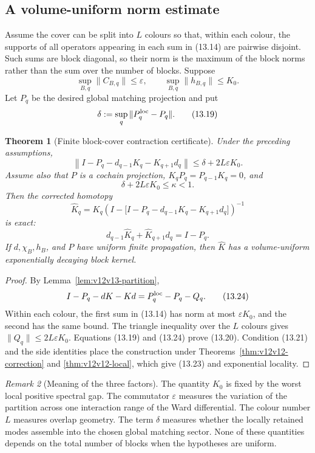 \documentclass[11pt]{article}
\newtheorem{theorem}{Theorem}[section]
\theoremstyle{remark}
\newtheorem{remark}[theorem]{Remark}
\begin{document}
\subsection{A volume-uniform norm estimate}

Assume the cover can be split into \(L\) colours so that, within each
colour, the supports of all operators appearing in each sum in
(13.14) are pairwise disjoint.  Such sums are block diagonal, so
their norm is the maximum of the block norms rather than the sum over
the number of blocks.  Suppose
\[
 \sup_{B,q}\|C_{B,q}\|\le\varepsilon,\qquad
 \sup_{B,q}\|h_{B,q}\|\le K_0.                             \tag{13.18}
\]
Let \(P_q\) be the desired global matching projection and put
\[
                         \delta:=
 \sup_q\|P^{\rm loc}_q-P_q\|.                              \tag{13.19}
\]

\begin{theorem}[Finite block-cover contraction certificate]
\label{thm:v12v13-certificate}
Under the preceding assumptions,
\[
 \left\|I-P_q-d_{q-1}K_q-K_{q+1}d_q\right\|
 \le \delta+2L\varepsilon K_0.                             \tag{13.20}
\]
Assume also that \(P\) is a cochain projection,
\(K_qP_q=P_{q-1}K_q=0\), and
\[
                         \boxed{
 \delta+2L\varepsilon K_0\le\kappa<1.}                     \tag{13.21}
\]
Then the corrected homotopy
\[
 \widehat K_q
 =K_q\left(
 I-\bigl[I-P_q-d_{q-1}K_q-K_{q+1}d_q\bigr]
 \right)^{-1}                                               \tag{13.22}
\]
is exact:
\[
 d_{q-1}\widehat K_q+\widehat K_{q+1}d_q=I-P_q.            \tag{13.23}
\]
If \(d,\chi_B,h_B\), and \(P\) have uniform finite propagation, then
\(\widehat K\) has a volume-uniform exponentially decaying block
kernel.
\end{theorem}

\begin{proof}
By Lemma~\ref{lem:v12v13-partition},
\[
 I-P_q-dK-Kd=P^{\rm loc}_q-P_q-Q_q.                        \tag{13.24}
\]
Within each colour, the first sum in (13.14) has norm at most
\(\varepsilon K_0\), and the second has the same bound.
The triangle inequality over the \(L\) colours gives
\(\|Q_q\|\le2L\varepsilon K_0\).  Equations (13.19) and (13.24)
prove (13.20).  Condition (13.21) and the side identities place the
construction under Theorems~\ref{thm:v12v12-correction} and
\ref{thm:v12v12-local}, which give (13.23) and exponential locality.
\end{proof}

\begin{remark}[Meaning of the three factors]
\label{rem:v12v13-factors}
The quantity \(K_0\) is fixed by the worst local positive spectral
gap.  The commutator \(\varepsilon\) measures the variation of the
partition across one interaction range of the Ward differential.
The colour number \(L\) measures overlap geometry.  The term
\(\delta\) measures whether the locally retained modes assemble into
the chosen global matching sector.  None of these quantities depends
on the total number of blocks when the hypotheses are uniform.
\end{remark}
\end{document}
